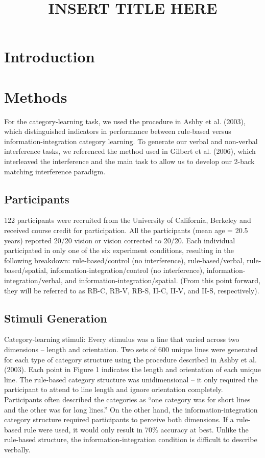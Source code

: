 \documentclass[apacite, draftfirst, jou]{apa6}
\title{INSERT TITLE HERE}
\begin{document}
\maketitle

\section{Introduction}

\section{Methods}
For the category-learning task, we used the procedure in Ashby et al. (2003),
which distinguished indicators in performance between rule-based versus
information-integration category learning. To generate our verbal and non-verbal
interference tasks, we referenced the method used in Gilbert et al. (2006),
which interleaved the interference and the main task to allow us to develop our
2-back matching interference paradigm.

\subsection{Participants}
122 participants were recruited from the University of California, Berkeley and
received course credit for participation. All the participants (mean age = 20.5
years) reported 20/20 vision or vision corrected to 20/20. Each individual
participated in only one of the six experiment conditions, resulting in the
following breakdown: rule-based/control (no interference), rule-based/verbal,
rule-based/spatial, information-integration/control (no interference),
information-integration/verbal, and information-integration/spatial. (From this
point forward, they will be referred to as RB-C, RB-V, RB-S, II-C, II-V, and
II-S, respectively).

\subsection{Stimuli Generation}
Category-learning stimuli: Every stimulus was a line that varied across two
dimensions – length and orientation. Two sets of 600 unique lines were generated
for each type of category structure using the procedure described in Ashby et
al. (2003). Each point in Figure 1 indicates the length and orientation of each
unique line. The rule-based category structure was unidimensional – it only
required the participant to attend to line length and ignore orientation
completely. Participants often described the categories as “one category was for
short lines and the other was for long lines.” On the other hand, the
information-integration category structure required participants to perceive
both dimensions. If a rule-based rule were used, it would only result in 70\%
accuracy at best. Unlike the rule-based structure, the information-integration
condition is difficult to describe verbally.
\end{document}
